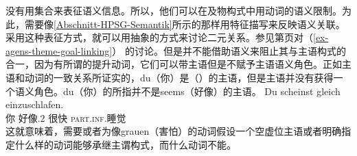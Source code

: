  \citet{MR2001a} 没有用集合来表征语义信息。所以，他们可以在及物构式中用动词的语义限制。为此，需要像\ref{Abschnitt-HPSG-Semantik}所示的那样用特征描写来反映语义关联。采用这种表征方式，就可以用抽象的方式来讨论二元关系。参见第\pageref{ex-agens-theme-goal-linking}页对（\ref{ex-agens-theme-goal-linking}） 的讨论。但是并不能借助语义来阻止其与主语构式的合一，因为有所谓的提升动词，它们可以带主语但是不赋予主语语义角色。正如主语和动词的一致关系所证实的，du（你）是（）的主语，但是主语并没有获得一个语义角色。du（你）的所指并不是seems（好像）的主语。
\ea
\gll Du scheinst gleich einzuschlafen.\\
     你 好像.2\sg{} 很快 \textsc{part}.\textsc{inf}.睡觉\\
\z
这就意味着，需要或者为像grauen（害怕）的动词假设一个空虚位主语或者明确指定什么样的动词能够承继主谓构式，而什么动词不能。

